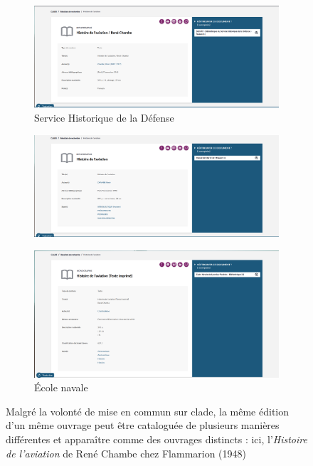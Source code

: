 \begin{figure}[h]
	\centering
	\begin{subfigure}{0.7\textwidth}
		\centering
		\includegraphics[width=\linewidth]{img/IMG_clade_histoireaviation_shdTL}
		\caption{Service Historique de la Défense}
		\label{img:cladehistoireaviationshdtl}
	\end{subfigure}
	\begin{subfigure}{0.7\textwidth}
		\centering
		\includegraphics[width=\linewidth]{img/IMG_clade_histoireaviation_mae}
		\caption{\mae}
		\label{img:cladehistoireaviationsmae}
	\end{subfigure}
	\hfill
	\begin{subfigure}{0.7\textwidth}
		\centering
		\includegraphics[width=\linewidth]{img/IMG_clade_histoireaviation_navale}
		\caption{École navale}
		\label{img:cladehistoireaviationnavale}
	\end{subfigure}
	\caption[Différences de catalogage entre les \bibmusee sur \ac{clade}]{Malgré la volonté de mise en commun sur \ac{clade}, la même édition d'un même ouvrage peut être cataloguée de plusieurs manières différentes et apparaître comme des ouvrages distincts : ici, l'\textit{Histoire de l'aviation} de René Chambe chez Flammarion (1948)}
	\label{fig:clade_histoaviation}
\end{figure}